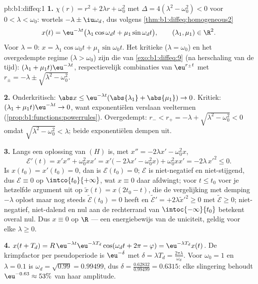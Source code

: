 \begin{solution}{pb:b1:diffeq:1}
\textbf{1.} $\chi(r) = r^2 + 2\lambda r + \omega_0^2$ met $\Delta =
4(\lambda^2 - \omega_0^2) < 0$ voor $0 < \lambda < \omega_0$: wortels
$-\lambda \pm \iu\omega_d$, dus volgens
\cref{thm:b1:diffeq:homogeneous2}
\[
x(t) = \eu^{-\lambda t}\bigl(\lambda_1\cos\omega_d t +
\mu_1\sin\omega_d t\bigr), \qquad (\lambda_1, \mu_1) \in \R^2 .
\]
Voor $\lambda = 0$: $x = \lambda_1\cos\omega_0 t + \mu_1\sin\omega_0 t$.
Het kritieke ($\lambda = \omega_0$) en het overgedempte regime ($\lambda
> \omega_0$) zijn die van \cref{exo:b1:diffeq:9} (na herschaling van de
tijd): $(\lambda_1 + \mu_1 t)\eu^{-\lambda t}$, respectievelijk
combinaties van $\eu^{r_\pm t}$ met $r_\pm = -\lambda \pm
\sqrt{\lambda^2 - \omega_0^2}$.

\textbf{2.} Onderkritisch: $\abs x \leq \eu^{-\lambda t}(\abs{\lambda_1}
+ \abs{\mu_1}) \to 0$. Kritiek: $(\lambda_1 + \mu_1 t)\eu^{-\lambda t}
\to 0$, want exponentiëlen verslaan veeltermen
(\cref{prop:b1:functions:powerrules}). Overgedempt: $r_- < r_+ =
-\lambda + \sqrt{\lambda^2 - \omega_0^2} < 0$ omdat $\sqrt{\lambda^2 -
\omega_0^2} < \lambda$; beide exponentiëlen dempen uit.

\textbf{3.} Langs een oplossing van $(H)$ is, met $x'' = -2\lambda x' -
\omega_0^2 x$,
\[
\mathcal E'(t) = x'x'' + \omega_0^2 x x'
= x'\bigl(-2\lambda x' - \omega_0^2 x\bigr) + \omega_0^2 xx'
= -2\lambda\,x'^2 \leq 0 .
\]
Is $x(t_0) = x'(t_0) = 0$, dan is $\mathcal E(t_0) = 0$; $\mathcal E$ is
niet-negatief en niet-stijgend, dus $\mathcal E \equiv 0$ op
$\intco{t_0}{+\infty}$, wat $x \equiv 0$ daar afdwingt; voor $t \leq t_0$
voer je hetzelfde argument uit op $\tilde x(t) = x(2t_0 - t)$, die de
vergelijking met demping $-\lambda$ oplost maar nog steeds $\tilde{\mathcal
E}(t_0) = 0$ heeft en $\tilde{\mathcal E}' = +2\lambda\tilde x'^2 \geq 0$
met $\tilde{\mathcal E} \geq 0$; niet-negatief, niet-dalend en nul aan de
rechterrand van $\intoc{-\infty}{t_0}$ betekent overal nul. Dus $x \equiv
0$ op $\R$ --- een energiebewijs van de uniciteit, geldig voor elke
$\lambda \geq 0$.

\textbf{4.} $x(t + T_d) = R\,\eu^{-\lambda t}\eu^{-\lambda
T_d}\cos(\omega_d t + 2\pi - \varphi) = \eu^{-\lambda T_d}x(t)$. De
krimpfactor per pseudoperiode is $\eu^{-\delta}$ met $\delta = \lambda
T_d = \frac{2\pi\lambda}{\omega_d}$. Voor $\omega_0 = 1$ en $\lambda =
0.1$ is $\omega_d = \sqrt{0.99} = 0.99499$, dus $\delta =
\frac{0.62832}{0.99499} = 0.6315$: elke slingering behoudt
$\eu^{-0.63} \approx 53\%$ van haar amplitude.


\end{solution}
